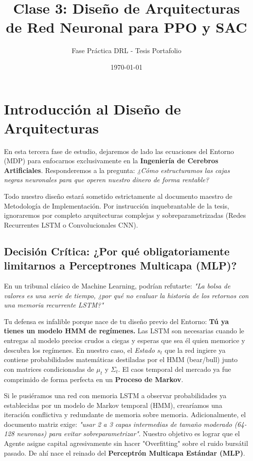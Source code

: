 \documentclass[11pt,a4paper]{article}
\title{\textbf{Clase 3: Diseño de Arquitecturas de Red Neuronal para PPO y SAC}}
\author{Fase Práctica DRL - Tesis Portafolio}
\date{\today}
\begin{document}
\maketitle

\section*{Introducción al Diseño de Arquitecturas}
En esta tercera fase de estudio, dejaremos de lado las ecuaciones del Entorno (MDP) para enfocarnos exclusivamente en la \textbf{Ingeniería de Cerebros Artificiales}. Responderemos a la pregunta: \textit{¿Cómo estructuramos las cajas negras neuronales para que operen nuestro dinero de forma rentable?}

Todo nuestro diseño estará sometido estrictamente al documento maestro de Metodología de Implementación. Por instrucción inquebrantable de la tesis, ignoraremos por completo arquitecturas complejas y sobreparametrizadas (Redes Recurrentes LSTM o Convolucionales CNN). 

\subsection*{Decisión Crítica: ¿Por qué obligatoriamente limitarnos a Perceptrones Multicapa (MLP)?}
En un tribunal clásico de Machine Learning, podrían refutarte: \textit{"La bolsa de valores es una serie de tiempo, ¿por qué no evaluar la historia de los retornos con una memoria recurrente LSTM?"}

Tu defensa es infalible porque nace de tu diseño previo del Entorno: \textbf{Tú ya tienes un modelo HMM de regímenes.}
Las LSTM son necesarias cuando le entregas al modelo precios crudos a ciegas y esperas que sea él quien memorice y descubra los regímenes. En nuestro caso, el \textit{Estado $s_t$} que la red ingiere ya contiene probabilidades matemáticas destiladas por el HMM (bear/bull) junto con matrices condicionadas de $\mu_t$ y $\Sigma_t$. El caos temporal del mercado ya fue comprimido de forma perfecta en un \textbf{Proceso de Markov}.

Si le pusiéramos una red con memoria LSTM a observar probabilidades ya establecidas por un modelo de Markov temporal (HMM), crearíamos una iteración conflictiva y redundante de memoria sobre memoria. Adicionalmente, el documento matriz exige: \textit{"usar 2 a 3 capas intermedias de tamaño moderado (64-128 neuronas) para evitar sobreparametrizar"}. Nuestro objetivo es lograr que el Agente asigne capital agresivamente sin hacer "Overfitting" sobre el ruido bursátil pasado. De ahí nace el reinado del \textbf{Perceptrón Multicapa Estándar (MLP)}.
\end{document}
